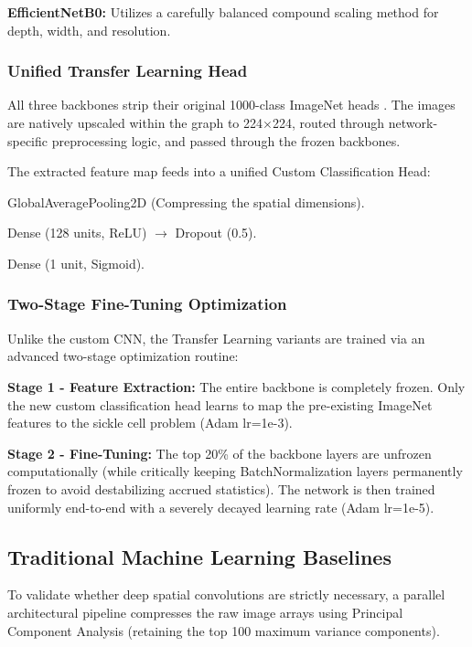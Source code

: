 \noindent\textbf{EfficientNetB0:} Utilizes a carefully balanced compound scaling method for depth, width, and resolution.

\subsubsection{Unified Transfer Learning Head}

All three backbones strip their original 1000-class ImageNet heads . The images are natively upscaled within the graph to 224$\times$224, routed through network-specific preprocessing logic, and passed through the frozen backbones.

The extracted feature map feeds into a unified Custom Classification Head:

GlobalAveragePooling2D (Compressing the spatial dimensions).

Dense (128 units, ReLU) $\rightarrow$ Dropout (0.5).

Dense (1 unit, Sigmoid).

\subsubsection{Two-Stage Fine-Tuning Optimization}

Unlike the custom CNN, the Transfer Learning variants are trained via an advanced two-stage optimization routine:

\noindent\textbf{Stage 1 - Feature Extraction:} The entire backbone is completely frozen. Only the new custom classification head learns to map the pre-existing ImageNet features to the sickle cell problem (Adam lr=1e-3).

\noindent\textbf{Stage 2 - Fine-Tuning:} The top 20\% of the backbone layers are unfrozen computationally (while critically keeping BatchNormalization layers permanently frozen to avoid destabilizing accrued statistics). The network is then trained uniformly end-to-end with a severely decayed learning rate (Adam lr=1e-5).

\subsection{Traditional Machine Learning Baselines}

To validate whether deep spatial convolutions are strictly necessary, a parallel architectural pipeline compresses the raw image arrays using Principal Component Analysis (retaining the top 100 maximum variance components).

